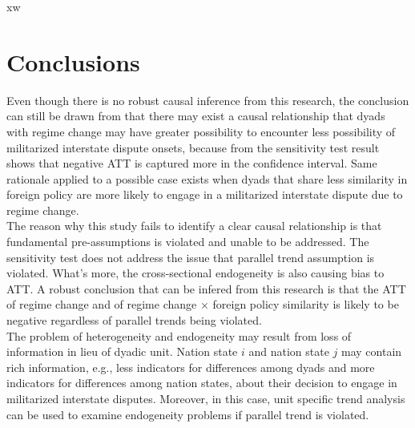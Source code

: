 \documentclass[12pt,a4paper]{article}
\begin{document}
xw\section{Conclusions}
Even though there is no robust causal inference from this research, the conclusion can still be drawn from that there may exist a causal relationship that dyads with regime change may have greater possibility to encounter less possibility of militarized interstate dispute onsets, because from the sensitivity test result shows that negative ATT is captured more in the confidence interval. Same rationale applied to a possible case exists when dyads that share less similarity in foreign policy are more likely to engage in a militarized interstate dispute due to regime change. 
\\The reason why this study fails to identify a clear causal relationship is that fundamental pre-assumptions is violated and unable to be addressed. The sensitivity test does not address the issue that parallel trend assumption is violated. What's more, the cross-sectional endogeneity is also causing bias to ATT. A robust conclusion that can be infered from this research is that the ATT of regime change and of regime change $\times$ foreign policy similarity is likely to be negative regardless of parallel trends being violated.
\\ The problem of heterogeneity and endogeneity may result from loss of information in lieu of dyadic unit. Nation state $i$ and nation state $j$ may contain rich information, e.g., less indicators for differences among dyads and more indicators for differences among nation states, about their decision to engage in militarized interstate disputes. Moreover, in this case, unit specific trend analysis can be used to examine endogeneity problems if parallel trend is violated. 


\printbibliography





\renewcommand\theequation{\Alph{section}\arabic{equation}} %
\renewcommand\thefigure{\Alph{section}\arabic{figure}} %
\renewcommand\thetable{\Alph{section}\arabic{table}} %
\end{document}
